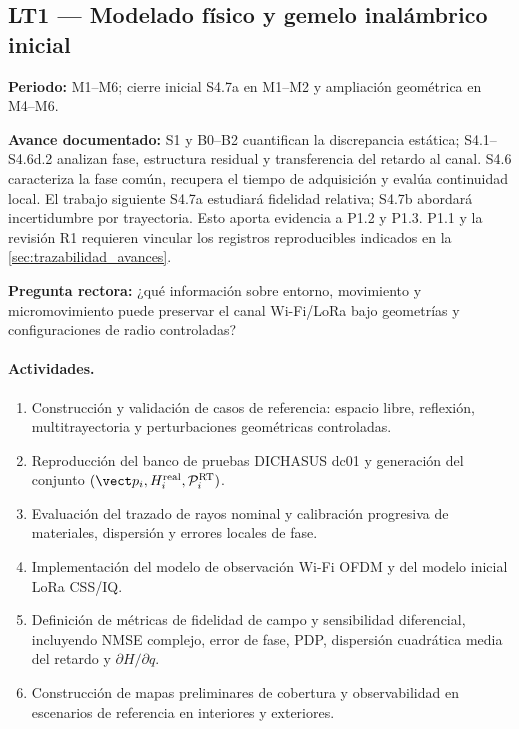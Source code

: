 \subsection{LT1 --- Modelado físico y gemelo inalámbrico inicial}
\label{sec:wp1_stage1}

\textbf{Periodo:} M1--M6; cierre inicial S4.7a en M1--M2 y ampliación geométrica en M4--M6.

\textbf{Avance documentado:} S1 y B0--B2 cuantifican la discrepancia estática; S4.1--S4.6d.2 analizan fase, estructura residual y transferencia del retardo al canal. S4.6 caracteriza la fase común, recupera el tiempo de adquisición y evalúa continuidad local. El trabajo siguiente S4.7a estudiará fidelidad relativa; S4.7b abordará incertidumbre por trayectoria. Esto aporta evidencia a P1.2 y P1.3. P1.1 y la revisión R1 requieren vincular los registros reproducibles indicados en la \cref{sec:trazabilidad_avances}.

\textbf{Pregunta rectora:} ¿qué información sobre entorno, movimiento y micromovimiento
puede preservar el canal Wi-Fi/LoRa bajo geometrías y configuraciones de radio
controladas?

\paragraph{Actividades.}
\begin{enumerate}[label=\textbf{LT1.\arabic*:},leftmargin=3.8em]
    \item Construcción y validación de casos de referencia: espacio libre, reflexión,
    multitrayectoria y perturbaciones geométricas controladas.
    \item Reproducción del banco de pruebas DICHASUS dc01 y generación del conjunto
    $(\vect p_i,H_i^{\rm real},\mathcal P_i^{\rm RT})$.
    \item Evaluación del trazado de rayos nominal y calibración progresiva de materiales,
    dispersión y errores locales de fase.
    \item Implementación del modelo de observación Wi-Fi OFDM y del modelo inicial
    LoRa CSS/IQ.
    \item Definición de métricas de fidelidad de campo y sensibilidad diferencial,
    incluyendo NMSE complejo, error de fase, PDP, dispersión cuadrática media del retardo y
    $\partial H/\partial q$.
    \item Construcción de mapas preliminares de cobertura y observabilidad en
    escenarios de referencia en interiores y exteriores.
\end{enumerate}

